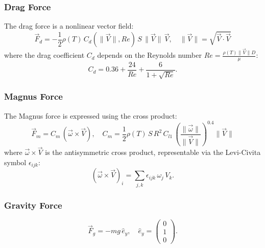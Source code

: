 \documentclass[10pt,a4paper]{report}
\begin{document}
\subsubsection{Drag Force}
The drag force is a nonlinear vector field:
\begin{equation}
    \vec{F}_d = -\frac{1}{2} \rho(T) \, C_d(\|\vec{V}\|, Re) \, S \, \|\vec{V}\| \, \vec{V}, \quad \|\vec{V}\| = \sqrt{\vec{V} \cdot \vec{V}}
    \label{eq:tensor_drag}
\end{equation}
where the drag coefficient $C_d$ depends on the Reynolds number $Re = \frac{\rho(T) \|\vec{V}\| D}{\mu}$:
\begin{equation}
    C_d = 0.36 + \frac{24}{Re} + \frac{6}{1 + \sqrt{Re}}.
    \label{eq:tensor_cd}
\end{equation}

\subsubsection{Magnus Force}
The Magnus force is expressed using the cross product:
\begin{equation}
    \vec{F}_m = C_m \, (\vec{\omega} \times \vec{V}), \quad C_m = \frac{1}{2} \rho(T) \, S \, R^2 \, C_{l1} \, \left( \frac{\|\vec{\omega}\|}{\|\vec{V}\|} \right)^{0.4} \|\vec{V}\|
    \label{eq:tensor_magnus}
\end{equation}
where $\vec{\omega} \times \vec{V}$ is the antisymmetric cross product, representable via the Levi-Civita symbol $\epsilon_{ijk}$:
\begin{equation}
    (\vec{\omega} \times \vec{V})_i = \sum_{j,k} \epsilon_{ijk} \, \omega_j \, V_k.
    \label{eq:tensor_cross}
\end{equation}

\subsubsection{Gravity Force}
\begin{equation}
    \vec{F}_g = -m g \, \hat{e}_y, \quad \hat{e}_y = \begin{pmatrix} 0 \\ 1 \\ 0 \end{pmatrix}.
    \label{eq:tensor_gravity}
\end{equation}
\end{document}
